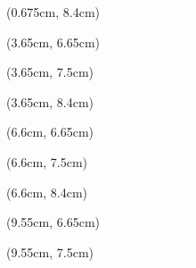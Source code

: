 \documentclass[aspectratio=3219]{beamer}
\begin{document}
{\begin{frame}
\begin{textblock*}{3cm}(0.675cm, 8.4cm)
    \centering
    \textcolor{white}{\tiny \it {{country0}} \\}
\end{textblock*}

\begin{textblock*}{2.95cm}(3.65cm, 6.65cm)
    \centering
    \textcolor{white}{\tiny \bf {{award1}} \\}
\end{textblock*}

\begin{textblock*}{2.95cm}(3.65cm, 7.5cm)
    \centering
    \textcolor{white}{\scriptsize {{surname1}} {{name1}} \\}
\end{textblock*}

\begin{textblock*}{2.95cm}(3.65cm, 8.4cm)
    \centering
    \textcolor{white}{\tiny \it {{country1}} \\}
\end{textblock*}

\begin{textblock*}{2.95cm}(6.6cm, 6.65cm)
    \centering
    \textcolor{white}{\tiny \bf {{award2}}\\}
\end{textblock*}

\begin{textblock*}{2.95cm}(6.6cm, 7.5cm)
    \centering
    \textcolor{white}{\scriptsize {{surname2}} {{name2}} \\}
\end{textblock*}

\begin{textblock*}{2.95cm}(6.6cm, 8.4cm)
    \centering
    \textcolor{white}{\tiny \it {{country2}} \\}
\end{textblock*}

\begin{textblock*}{2.95cm}(9.55cm, 6.65cm)
    \centering
    \textcolor{white}{\tiny \bf {{award3}}\\}
\end{textblock*}

\begin{textblock*}{2.95cm}(9.55cm, 7.5cm)
    \centering
    \textcolor{white}{\scriptsize {{surname3}} {{name3}} \\}
\end{textblock*}


\end{frame}}
\end{document}
